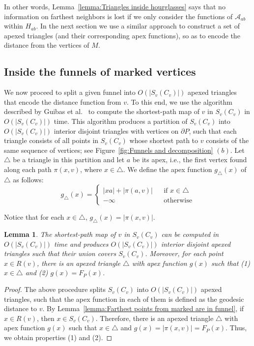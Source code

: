 \documentclass[a4paper]{article}
\newtheorem{lemma}[theorem]{Lemma}
\newcommand{\F}[2]{\ensuremath{F_{\scriptscriptstyle #1}(#2)}}
\newcommand{\fn}[2]{\ensuremath{S_{\scriptscriptstyle #1}(#2)}}
\newcommand{\g}[2]{\ensuremath{|\pi(#1, #2)|}}
\newcommand{\p}[2]{\ensuremath{\pi(#1, #2)}}
\begin{document}
In other words, Lemma~\ref{lemma:Triangles inside hourglasses} says that no information on farthest neighbors is lost if we only consider the functions of $\mathcal A_{ab}$ within $H_{ab}$.  
In the next section we use a similar approach to construct a set of apexed triangles (and their corresponding apex functions), so as to encode the distance from the vertices of $M$.

\subsection{Inside the funnels of marked vertices}

We now proceed to split a given funnel into $O(|\fn{v}{C_v}|)$ apexed triangles that encode the distance function from $v$. 
To this end, we use the algorithm described by Guibas et al.~\cite[Section 2]{guibasShortestPathQueries} to compute the shortest-path map of $v$ in $\fn{v}{C_v}$ in $O(|\fn{v}{C_v}|)$ time.
This algorithm produces a partition of $\fn{v}{C_v}$ into $O(|\fn{v}{C_v}|)$ interior disjoint triangles with vertices on $\partial P$, such that each triangle consists of all points in $\fn{v}{C_v}$ whose shortest path to $v$ consists of the same sequence of vertices; see Figure~\ref{fig:Funnels and decomposition} $(b)$.
Let $\triangle$ be a triangle in this partition and let $a$ be its apex, i.e., the first vertex found along each path $\p{x}{v}$, where $x\in \triangle$. We define the apex function $g_\triangle(x)$ of $\triangle$ as follows:
$$g_\triangle(x) = \left\{ \begin{array}{lll}
|x a| + \g{a}{v} && \text{if }x\in \triangle\\
-\infty&&\text{otherwise}
\end{array}\right.$$

Notice that for each $x\in \triangle$, $g_\triangle(x) = \g{x}{v}$.

\begin{lemma}\label{lemma:Triangles inside funnels}
The shortest-path map of $v$ in $\fn{v}{C_v}$ can be computed in $O(|\fn{v}{C_v}|)$ time and produces $O(|\fn{v}{C_v}|)$ interior disjoint apexed triangles such that their union covers $\fn{v}{C_v}$. 
Moreover, for each point $x\in R(v)$,  
there is an apexed triangle $\triangle$ with apex function $g(x)$ such that 
(1) $x\in \triangle$ and (2) $g(x) = \F{P}{x}$.
\end{lemma}
\begin{proof}
The above procedure splits $\fn{v}{C_v}$ into $O(|\fn{v}{C_v}|)$ apexed triangles, such that the apex function in each of them is defined as the geodesic distance to $v$. 
By Lemma~\ref{lemma:Farthest points from marked are in funnel}, if $x\in R(v)$, then $x\in \fn{v}{C_v}$. 
Therefore, there is an apexed triangle $\triangle$ with apex function $g(x)$ such that $x\in \triangle$ and $g(x) = \g{x}{v} = \F{P}{x}$. Thus, we obtain properties (1) and (2).
\end{proof}
\end{document}
